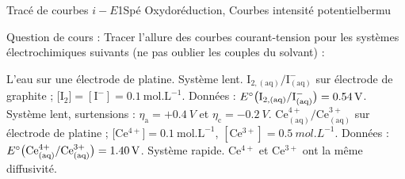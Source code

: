 
\begin{exercise}{Tracé de courbes $i-E$}{1}{Spé}
{Oxydoréduction, Courbes intensité potentiel}{bermu}

\textsf{Question de cours :} Tracer l’allure des courbes courant-tension pour les systèmes électrochimiques suivants (ne pas oublier les couples du solvant) :

\begin{questions}
    \question L'eau sur une électrode de platine. Système lent.
    \question $\mathrm{I_{2,(aq)}/I^-_{(aq)}}$ sur électrode de graphite ; $[\mathrm{I_2] = [\mathrm{I^-}] = \SI{0.1}{mol.L^{-1}}}$. \newline
     \hspace*{-2.1em}\textsf{Données :} $E^\circ\qty\big(\mathrm{I_{2,(aq)}/I^-_{(aq)}}) = \SI{0.54}{V}$.
    Système lent, surtensions : $\eta_\text{a} = +\SI{0.4}{V}$ et $\eta_\text{c} = \SI{-0.2}{V}$.
    \question $\mathrm{Ce^{4+}_{(aq)}/Ce^{3+}_{(aq)}}$ sur électrode de platine ; $[\mathrm{Ce^{4+}] = \SI{0.1}{mol.L^{-1}}}$, $[\mathrm{Ce^{3+}}] = \SI{0.5}{mol.L^{-1}}$. \newline
     \hspace*{-2.1em}\textsf{Données :} $E^\circ\qty\big(\mathrm{Ce^{4+}_{(aq)}/Ce^{3+}_{(aq)}}) = \SI{1.40}{V}$.
    Système rapide. $\mathrm{Ce^{4+}}$ et $\mathrm{Ce^{3+}}$ ont la même diffusivité.
\end{questions}

\end{exercise}

